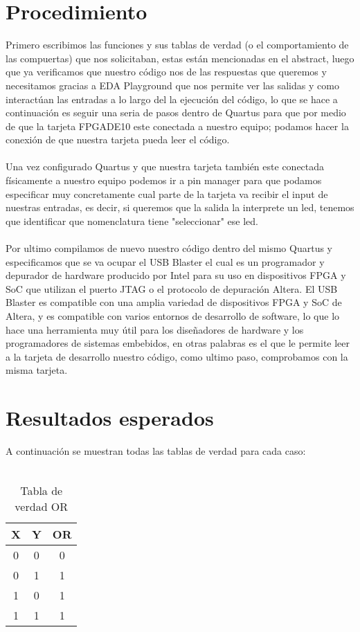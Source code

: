 \documentclass{article}
\begin{document}
\begin{multicols}{2}
\section{Procedimiento}\label{sec:procedim}
Primero escribimos las funciones y sus tablas de verdad (o el comportamiento de las compuertas) que nos solicitaban, estas están mencionadas en el abstract,
luego que ya verificamos que nuestro código nos de las respuestas que queremos y necesitamos gracias a EDA Playground que nos permite ver las salidas y como interactúan las entradas a lo largo del la ejecución del código, lo que se hace a continuación es seguir una seria de pasos dentro de Quartus
para que por medio de que la tarjeta FPGADE10 este conectada a nuestro equipo; podamos hacer la conexión de que nuestra tarjeta pueda leer el código.\\
\\
Una vez configurado Quartus y que nuestra tarjeta también este conectada físicamente a nuestro equipo podemos ir a pin manager para que podamos especificar muy concretamente cual parte de la tarjeta va recibir el input de nuestras entradas, es decir, si queremos que la salida la interprete un led, tenemos que identificar que nomenclatura tiene "seleccionar" ese led.\\
\\
Por ultimo compilamos de nuevo nuestro código dentro del mismo Quartus y especificamos que se va ocupar el USB Blaster el cual es un programador y depurador de hardware producido por Intel para su uso en dispositivos FPGA y SoC que utilizan el puerto JTAG o el protocolo de depuración Altera. El USB Blaster es compatible con una amplia variedad de dispositivos FPGA y SoC de Altera, y es compatible con varios entornos de desarrollo de software, lo que lo hace una herramienta muy útil para los diseñadores de hardware y los programadores de sistemas embebidos, en otras palabras es el que le permite leer a la tarjeta de desarrollo nuestro código, como ultimo paso, comprobamos con la misma tarjeta.

\section{Resultados esperados}\label{sec:resEsperados}

A continuación se muestran todas las tablas de verdad para cada caso:\\
\\
\begin{table}[H]
	\centering
	\begin{tabular}{|c|c|c|}
		\hline
		X & Y & OR \\
		\hline
		0 & 0 & 0 \\	
		\hline
		0 & 1 & 1 \\
	\hline
	1 & 0 & 1 \\
	\hline
	1 & 1 & 1 \\
	\hline
\end{tabular}
\caption{Tabla de verdad OR}
\label{table:1}
\end{table}


\end{multicols}
\end{document}
